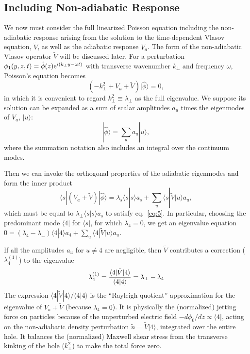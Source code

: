 \documentclass[12pt]{article}
\def\ket#1{|#1\rangle}
\def\bra#1{\langle#1}
\begin{document}
\subsection{Including Non-adiabatic Response}
We now must consider the full linearized Poisson equation including the
non-adiabatic response arising from the solution to the time-dependent
Vlasov equation, $\tilde{V}$, as well as the adiabatic response
$V_a$. The form of the non-adiabatic Vlasov operator $\tilde{V}$ will
be discussed later. For a perturbation
$\phi_1(y,z,t)=\hat\phi(z){\rm e}^{i(k_\perp y-\omega t)}$ with
transverse wavenumber $k_\perp$ and frequency $\omega$, Poisson's
equation becomes
\begin{equation}
  \label{eq:5}
  (-k_\perp^2+V_a+\tilde{V})\ket{\hat\phi}=0,
\end{equation}
in which it is convenient to regard $k_\perp^2\equiv\lambda_\perp$ as the
full eigenvalue. 
We suppose its solution can be expanded as a sum of scalar
amplitudes $a_u$ times the eigenmodes of $V_a$, $\ket{u}$:
\begin{equation}
  \label{eq:6}
  \ket{\hat\phi}=\sum_u a_u \ket{u},
\end{equation}
where the summation notation also includes an integral over the
continuum modes.

Then we can invoke the orthogonal properties of the
adiabatic eigenmodes and form the inner product
\begin{equation}
  \label{eq:7}
  \bra{s}|(%
  V_a+\tilde{V})\ket{\hat\phi}
  = %
  \lambda_s\bra{s}\ket{s}a_s+\sum_u\bra{s}|\tilde{V}\ket{u}a_u,
\end{equation}
which must be equal to $\lambda_\perp\bra{s}\ket{s}a_s$ to satisfy eq.\ \ref{eq:5}.
In particular, choosing the predominant mode $\bra{4}|$ for
$\bra{s}|$, for which $\lambda_4=0$, we get an eigenvalue equation
$0=(\lambda_4-\lambda_\perp)\bra{4}\ket{4}a_4+\sum_u\bra{4}|\tilde{V}\ket{u}a_u$.

If all the amplitudes $a_u$ for $u\not=4$ are negligible, then
$\tilde{V}$ contributes a correction ($\lambda_{4}^{(1)}$) to the eigenvalue
\begin{equation}
  \label{eq:8}
  \lambda_{4}^{(1)}= {\bra{4}|\tilde{V}\ket{4}\over\bra{4}\ket{4}}=\lambda_\perp-\lambda_4
\end{equation}
The expression $\bra{4}|\tilde{V}\ket{4}/\bra{4}\ket{4}$ is the ``Rayleigh
quotient'' approximation for the eigenvalue of $V_a+\tilde{V}$
(because $\lambda_4=0$). It is
physically the (normalized) jetting force on particles because of the
unperturbed electric field $-d\phi_0/dz\propto\bra{4}|$, acting on the
non-adiabatic density perturbation $\tilde n = \tilde{V}\ket{4}$, integrated
over the entire hole. It balances the (normalized) Maxwell shear
stress from the transverse kinking of the hole ($k_\perp^2$) to
make the total force zero.
\end{document}
